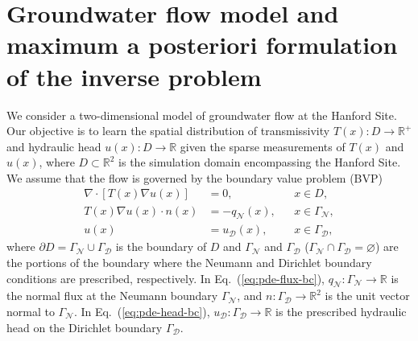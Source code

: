 \documentclass{agujournal2019}
\begin{document}
\section{Groundwater flow model and maximum a posteriori formulation of the inverse problem}
\label{sec:problem}

We consider a two-dimensional model of groundwater flow at the Hanford Site.
Our objective is to learn the spatial distribution of transmissivity $T(x)\colon D \to \mathbb{R}^+$
and hydraulic head $u(x)\colon D \to \mathbb{R}$ given the sparse measurements of $T(x)$ and $u(x)$, where $D \subset \mathbb{R}^2$ is the simulation domain encompassing the Hanford Site. 
We assume that the flow is governed by the boundary value problem (BVP)
%
\begin{align}
  \label{eq:pde}
  \nabla \cdot \left [ T(x) \nabla u(x) \right ] & = 0, && x \in D,\\
  \label{eq:pde-flux-bc}
  T(x) \nabla u(x) \cdot n(x) &= -q_\mathcal{N}(x), && x \in \Gamma_\mathcal{N},\\
  \label{eq:pde-head-bc}
  u(x) &= u_\mathcal{D}(x), && x \in \Gamma_\mathcal{D},
\end{align}
%
where $\partial D = \Gamma_\mathcal{N} \cup \Gamma_\mathcal{D}$ is the boundary of $D$ and $\Gamma_\mathcal{N}$ and $\Gamma_\mathcal{D}$ ($\Gamma_\mathcal{N} \cap \Gamma_\mathcal{D} = \varnothing$) are the portions of the boundary where the Neumann and Dirichlet boundary conditions are prescribed, respectively.
In Eq.~(\ref{eq:pde-flux-bc}), $q_\mathcal{N} \colon \Gamma_\mathcal{N} \to \mathbb{R}$ is the normal flux at the Neumann boundary $\Gamma_\mathcal{N}$, and $n \colon \Gamma_\mathcal{D} \to \mathbb{R}^2$ is the unit vector normal to $\Gamma_\mathcal{N}$. In Eq.~(\ref{eq:pde-head-bc}), $u_\mathcal{D} \colon \Gamma_\mathcal{D} \to \mathbb{R}$ is the prescribed hydraulic head on the Dirichlet boundary $\Gamma_\mathcal{D}$.
\end{document}

